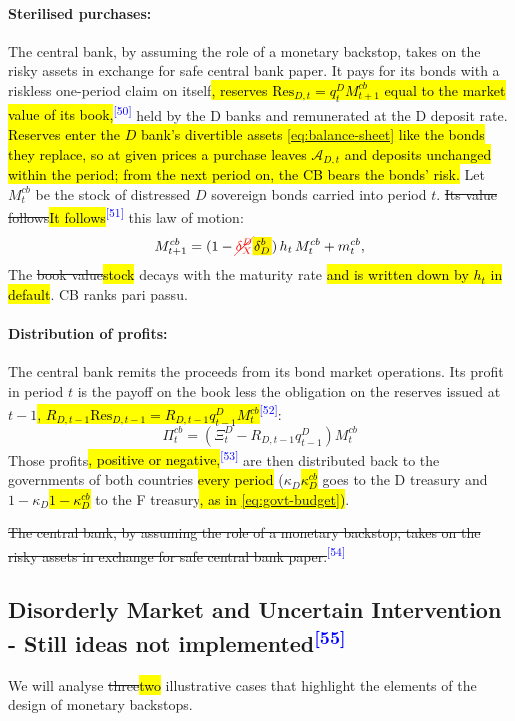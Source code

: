 \documentclass[11pt]{article}
\newcommand{\A}[1]{\hl{#1}}
\newcommand{\D}[1]{{\color{red}\st{#1}}}
\newcommand{\Am}[1]{\mathchoice
  {{\setlength{\fboxsep}{1pt}\colorbox{yellow}{$\displaystyle #1$}}}
  {{\setlength{\fboxsep}{1pt}\colorbox{yellow}{$\textstyle #1$}}}
  {{\setlength{\fboxsep}{1pt}\colorbox{yellow}{$\scriptstyle #1$}}}
  {{\setlength{\fboxsep}{1pt}\colorbox{yellow}{$\scriptscriptstyle #1$}}}}
\newcommand{\Dm}[1]{{\color{red}\cancel{#1}}}
\newcommand{\chg}[1]{\textsuperscript{\textcolor{blue}{\scriptsize[#1]}}}
\begin{document}
\paragraph{Sterilised purchases:} The central bank, by assuming the role of a monetary backstop, takes on the risky assets in exchange for safe central bank paper. It pays for its bonds with a riskless one-period claim on itself\A{, reserves $\mathrm{Res}_{D,t}=q^D_tM^{cb}_{t+1}$ equal to the market value of its book,}\chg{50} held by the D banks and remunerated at the D deposit rate. \A{Reserves enter the $D$ bank's divertible assets {\eqref{eq:balance-sheet}} like the bonds they replace, so at given prices a purchase leaves $\mathcal{A}_{D,t}$ and deposits unchanged within the period; from the next period on, the CB bears the bonds' risk.} Let  $M^{cb}_t$ be the stock of distressed $D$ sovereign bonds carried into period $t$. \D{Its value follows}\A{It follows}\chg{51} this law of motion:
\begin{equation}
    M^{cb}_{t+1}=(1-\Dm{\delta_X^D}\Am{\delta^b_D})\,h_t\,M^{cb}_t+m^{cb}_t,
\end{equation}
The \D{book value}\A{stock} decays with the maturity rate\A{ and is written down by $h_t$ in default}. CB ranks pari passu.
\paragraph{Distribution of profits:} The central bank remits the proceeds from its bond market operations.  Its profit in period $t$ is the payoff on the book less the obligation on the reserves issued at $t-1$\A{, $R_{D,t-1}\mathrm{Res}_{D,t-1}=R_{D,t-1}q^D_{t-1}M^{cb}_t$}\chg{52}:
\begin{equation}
\Pi^{cb}_t=\left( \Xi^{D}_t- R_{D,t-1}q_{t-1}^{D}\right)M^{cb}_{t}
\label{eq:cb-pl}
\end{equation}
Those profits\A{, positive or negative,}\chg{53} are then distributed back to the governments of both countries\A{ every period} (\D{$\kappa_D$}\A{$\kappa^{cb}_D$} goes to the D treasury and \D{$1-\kappa_D$}\A{$1-\kappa^{cb}_D$} to the F treasury\A{, as in {\eqref{eq:govt-budget}})}.

\D{The central bank, by assuming the role of a monetary backstop, takes on the risky assets in exchange for safe central bank paper.}\chg{54}

\subsection[Disorderly Market and Uncertain Intervention - Still ideas not implemented]{\texorpdfstring{Disorderly Market\protect\D{, XYZ,} and Uncertain Intervention\\ - Still ideas not implemented\protect\chg{55}}{Disorderly Market and Uncertain Intervention}}
We will analyse \D{three}\A{two} illustrative cases that highlight the elements of the design of monetary backstops.
\end{document}
